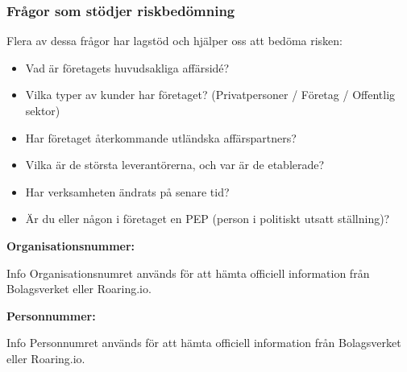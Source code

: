 \documentclass[10pt]{beamer}
\begin{document}
\begin{frame}[label=riskfragor]
  \frametitle{Frågor som stödjer riskbedömning}

  \small
  Flera av dessa frågor har lagstöd och hjälper oss att bedöma risken:
  \begin{itemize}
    \item Vad är företagets huvudsakliga affärsidé?
    \item Vilka typer av kunder har företaget? (Privatpersoner / Företag / Offentlig sektor)
    \item Har företaget återkommande utländska affärspartners?
    \item Vilka är de största leverantörerna, och var är de etablerade?
    \item Har verksamheten ändrats på senare tid?
    \item Är du eller någon i företaget en PEP (person i politiskt utsatt ställning)?
  \end{itemize}

  \vspace{0.5cm}
  	\textbf{Organisationsnummer:} \underline{\hspace{5cm}}
  \footnotesize
  \begin{block}{Info}
    Organisationsnumret används för att hämta officiell information från Bolagsverket eller Roaring.io.
  \end{block}

  \vspace{0.5cm}
  	\textbf{Personnummer:} \underline{\hspace{5cm}}
  \footnotesize
  \begin{block}{Info}
    Personnumret används för att hämta officiell information från Bolagsverket eller Roaring.io.
  \end{block}

  \vspace{0.8cm}
  \begin{flushright}
    \hyperlink{nextslide}{}
  \end{flushright}
\end{frame}
\end{document}
